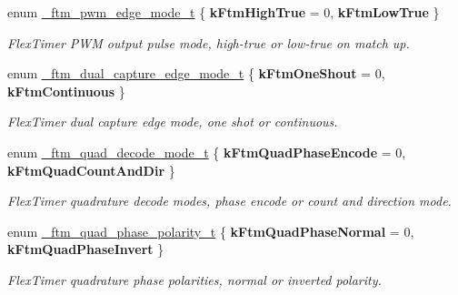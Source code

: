 \begin{DoxyCompactItemize}
\item 
enum \hyperlink{group__ftm__hal_ga6cf3ca8aba3464c254e0b451f4333de9}{\+\_\+ftm\+\_\+pwm\+\_\+edge\+\_\+mode\+\_\+t} \{ {\bfseries k\+Ftm\+High\+True} = 0, 
{\bfseries k\+Ftm\+Low\+True}
 \}\hypertarget{group__ftm__hal_ga6cf3ca8aba3464c254e0b451f4333de9}{}\label{group__ftm__hal_ga6cf3ca8aba3464c254e0b451f4333de9}
\begin{DoxyCompactList}\small\item\em Flex\+Timer P\+WM output pulse mode, high-\/true or low-\/true on match up. \end{DoxyCompactList}
\item 
enum \hyperlink{group__ftm__hal_ga975267f3de9c92904a6ce4d7951b5b18}{\+\_\+ftm\+\_\+dual\+\_\+capture\+\_\+edge\+\_\+mode\+\_\+t} \{ {\bfseries k\+Ftm\+One\+Shout} = 0, 
{\bfseries k\+Ftm\+Continuous}
 \}\hypertarget{group__ftm__hal_ga975267f3de9c92904a6ce4d7951b5b18}{}\label{group__ftm__hal_ga975267f3de9c92904a6ce4d7951b5b18}
\begin{DoxyCompactList}\small\item\em Flex\+Timer dual capture edge mode, one shot or continuous. \end{DoxyCompactList}
\item 
enum \hyperlink{group__ftm__hal_gaae2c75edcd2f32d67dc2f4ba14ff5240}{\+\_\+ftm\+\_\+quad\+\_\+decode\+\_\+mode\+\_\+t} \{ {\bfseries k\+Ftm\+Quad\+Phase\+Encode} = 0, 
{\bfseries k\+Ftm\+Quad\+Count\+And\+Dir}
 \}\hypertarget{group__ftm__hal_gaae2c75edcd2f32d67dc2f4ba14ff5240}{}\label{group__ftm__hal_gaae2c75edcd2f32d67dc2f4ba14ff5240}
\begin{DoxyCompactList}\small\item\em Flex\+Timer quadrature decode modes, phase encode or count and direction mode. \end{DoxyCompactList}
\item 
enum \hyperlink{group__ftm__hal_ga15ae8f0633b7d3fcf2b589861642cdf8}{\+\_\+ftm\+\_\+quad\+\_\+phase\+\_\+polarity\+\_\+t} \{ {\bfseries k\+Ftm\+Quad\+Phase\+Normal} = 0, 
{\bfseries k\+Ftm\+Quad\+Phase\+Invert}
 \}\hypertarget{group__ftm__hal_ga15ae8f0633b7d3fcf2b589861642cdf8}{}\label{group__ftm__hal_ga15ae8f0633b7d3fcf2b589861642cdf8}
\begin{DoxyCompactList}\small\item\em Flex\+Timer quadrature phase polarities, normal or inverted polarity. \end{DoxyCompactList}
\end{DoxyCompactItemize}
